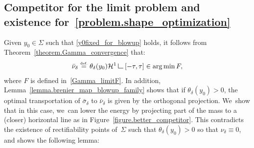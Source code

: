 \documentclass[JEP,XML,SOM,Unicode,NoFloatCountersInSection,published]{cedram}
\theoremstyle{definition}
\newcommand{\eqdef}{\ensuremath{\stackrel{\mbox{\upshape\tiny def.}}{=}}}
\newcommand\LM[1]{\hbox{\vrule width.5pt \vbox to#1pt{\vfill \hrule width#1pt height.5pt}}}
\newcommand\LL{{\mathchoice {\>\LM7\>}{\>\LM7\>}{\,\LM5\,}{\,\LM{3.35}\,}}}
\newcommand{\mres}{\LL}
\newcommand\cH{\mathcal{H}}
\DeclareMathOperator*{\argmin}{arg\,min}
\begin{document}
\subsection{Competitor for the limit problem and existence for~\eqref{problem.shape_optimization}}

Given $y_0\in \Sigma$ such that \eqref{y0fixed_for_blowup} holds, it follows from Theorem~\ref{theorem.Gamma_convergence} that:
\[
\bar \nu_{\delta} \eqdef \theta_\delta(y_0)\cH^1\mres [-\tau, \tau]
\in
\argmin F,
\]
where $F$ is defined in~\eqref{Gamma_limitF}.
In addition, Lemma~\ref{lemma.brenier_map_blowup_family} shows that if $\theta_\delta(y_0)>0$, the optimal transportation of $\bar \sigma_{\delta}$ to $\bar \nu_{\delta}$ is given by the orthogonal projection. We~show that in this case, we~can lower the energy by projecting part of the mass to a (closer) horizontal line as in Figure~\ref{figure.better_competitor}.
This contradicts the existence of rectifiability points of~$\Sigma$ such that $\theta_\delta(y_0) > 0$ so that $\nu_\delta \equiv 0$, and shows the following lemma:
\end{document}
